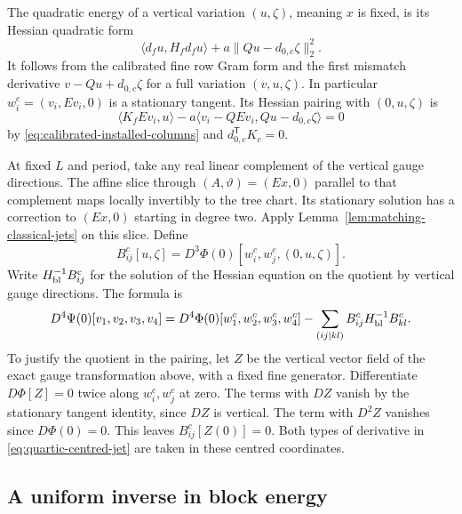 \documentclass[11pt,reqno]{amsart}
\numberwithin{equation}{section}
\theoremstyle{definition}
\theoremstyle{remark}
\begin{document}
The quadratic energy of a vertical variation \((u,\zeta)\),
meaning \(x\) is fixed, is its Hessian quadratic form
\begin{equation}
     \langle d_fu,H_fd_fu\rangle+a\|Qu-d_{0,c}\zeta\|_2^2.
 \label{eq:quartic-block-energy}
\end{equation}
It follows from the calibrated fine row Gram form and the
first mismatch derivative \(v-Qu+d_{0,c}\zeta\) for a full
variation \((v,u,\zeta)\). In particular
\(w_i^{c}=(v_i,Ev_i,0)\) is a stationary tangent. Its
Hessian pairing with \((0,u,\zeta)\) is
\[
 \langle K_f Ev_i,u\rangle
 -a\langle v_i-QEv_i,Qu-d_{0,c}\zeta\rangle=0
\]
by \eqref{eq:calibrated-installed-columns} and
\(d_{0,c}^{\mathsf T}K_c=0\).

At fixed \(L\) and period, take any real linear complement of the
vertical gauge directions. The affine slice through \((A,\vartheta)
=(Ex,0)\) parallel to that complement maps locally invertibly
to the tree chart. Its stationary solution has a correction to
\((Ex,0)\) starting in degree two. Apply
Lemma~\ref{lem:matching-classical-jets} on this slice. Define
\[
 B^c_{ij}[u,\zeta]=D^3\Phi(0)[w_i^c,w_j^c,(0,u,\zeta)].
\]
Write \(H_{\rm bl}^{-1} B^c_{ij}\) for the solution of the Hessian
equation on the quotient by vertical gauge directions. The formula is
\begin{equation}
 D^4\Psi(0)[v_1,v_2,v_3,v_4]
   =D^4\Phi(0)[w_1^c,w_2^c,w_3^c,w_4^c]
                    -\sum_{(ij|kl)} B^c_{ij}H_{\rm bl}^{-1}B^c_{kl}.
 \label{eq:quartic-centred-jet}
\end{equation}
To justify the quotient in the pairing, let \(Z\) be the vertical
vector field of the exact gauge transformation above, with a fixed
fine generator. Differentiate \(D\Phi[Z]=0\) twice along \(w_i^c,w_j^c\)
at zero. The terms with \(DZ\) vanish by the stationary tangent
identity, since \(DZ\) is vertical. The term with \(D^2Z\) vanishes
since \(D\Phi(0)=0\). This leaves \(B^c_{ij}[Z(0)]=0\).
Both types of derivative in \eqref{eq:quartic-centred-jet}
are taken in these centred coordinates.

\subsection{A uniform inverse in block energy}
\end{document}
